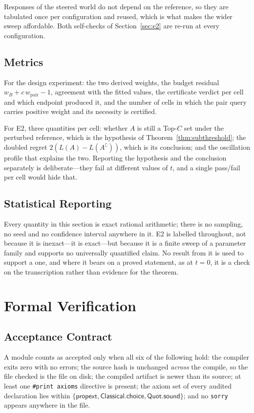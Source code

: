 Responses of the steered world do not depend on the reference, so they are tabulated once per
configuration and reused, which is what makes the wider sweep affordable. Both self-checks of
Section~\ref{sec:e2} are re-run at every configuration.

\subsection{Metrics}

For the design experiment: the two derived weights, the budget residual
$w_{B}+c\,w_{\mathrm{pair}}-1$, agreement with the fitted values, the certificate verdict per
cell and which endpoint produced it, and the number of cells in which the pair query carries
positive weight and its necessity is certified.

For E2, three quantities per cell: whether $A$ is still a Top-$C$ set under the perturbed
reference, which is the hypothesis of Theorem~\ref{thm:subthreshold}; the doubled regret
$2(L(A)-L(A^{\complement}))$, which is its conclusion; and the oscillation profile that
explains the two. Reporting the hypothesis and the conclusion separately is deliberate---they
fail at different values of $t$, and a single pass/fail per cell would hide that.

\subsection{Statistical Reporting}

Every quantity in this section is exact rational arithmetic; there is no sampling, no seed and
no confidence interval anywhere in it. E2 is labelled \NUM{} throughout, not because it is
inexact---it is exact---but because it is a finite sweep of a parameter family and supports no
universally quantified claim. No result from it is used to support a \PROVED{} one, and where
it bears on a proved statement, as at $t=0$, it is a check on the transcription rather than
evidence for the theorem.

\section{Formal Verification}
\label{sec:verification}

\subsection{Acceptance Contract}

A module counts as accepted only when all six of the following hold: the compiler exits zero
with no errors; the source hash is unchanged \emph{across} the compile, so the file checked is
the file on disk; the compiled artifact is newer than its source; at least one
\texttt{\#print axioms} directive is present; the axiom set of every audited declaration lies
within $\{\textsf{propext},\textsf{Classical.choice},\textsf{Quot.sound}\}$; and no
\texttt{sorry} appears anywhere in the file.

